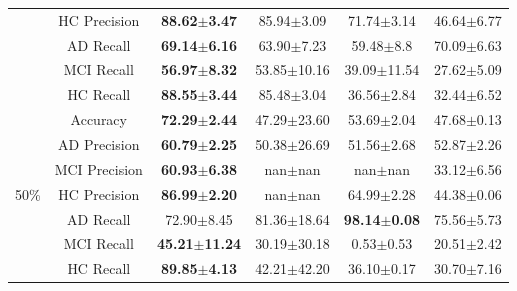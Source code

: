 \begin{table}[ht]
\begin{tabular}{c c cccc}
    & HC Precision & \multicolumn{1}{c}{{\bfseries 88.62$\pm$3.47}} & \multicolumn{1}{c}{85.94$\pm$3.09} & \multicolumn{1}{c}{71.74$\pm$3.14} & 46.64$\pm$6.77\\
    & AD Recall & \multicolumn{1}{c}{{\bfseries 69.14$\pm$6.16}} & \multicolumn{1}{c}{63.90$\pm$7.23} & \multicolumn{1}{c}{59.48$\pm$8.8} & 70.09$\pm$6.63\\
    & MCI Recall & \multicolumn{1}{c}{{\bfseries 56.97$\pm$8.32}} & \multicolumn{1}{c}{53.85$\pm$10.16} & \multicolumn{1}{c}{39.09$\pm$11.54} & 27.62$\pm$5.09\\
    & HC Recall & \multicolumn{1}{c}{{\bfseries 88.55$\pm$3.44}} & \multicolumn{1}{c}{85.48$\pm$3.04} & \multicolumn{1}{c}{36.56$\pm$2.84} & 32.44$\pm$6.52\\
    \midrule
    \multirow{7}{*}{50\%} %
    & Accuracy & \multicolumn{1}{c}{{\bfseries 72.29$\pm$2.44}} & \multicolumn{1}{c}{47.29$\pm$23.60} & \multicolumn{1}{c}{53.69$\pm$2.04} & 47.68$\pm$0.13\\
    & AD Precision & \multicolumn{1}{c}{{\bfseries 60.79$\pm$2.25}} & \multicolumn{1}{c}{50.38$\pm$26.69} & \multicolumn{1}{c}{51.56$\pm$2.68} & 52.87$\pm$2.26\\
    & MCI Precision & \multicolumn{1}{c}{{\bfseries 60.93$\pm$6.38}} & \multicolumn{1}{c}{nan$\pm$nan} & \multicolumn{1}{c}{nan$\pm$nan} & 33.12$\pm$6.56\\
    & HC Precision & \multicolumn{1}{c}{{\bfseries 86.99$\pm$2.20}} & \multicolumn{1}{c}{nan$\pm$nan} & \multicolumn{1}{c}{64.99$\pm$2.28} & 44.38$\pm$0.06\\
    & AD Recall & \multicolumn{1}{c}{72.90$\pm$8.45} & \multicolumn{1}{c}{81.36$\pm$18.64} & \multicolumn{1}{c}{{\bfseries 98.14$\pm$0.08}} & 75.56$\pm$5.73\\
    & MCI Recall & \multicolumn{1}{c}{{\bfseries 45.21$\pm$11.24}} & \multicolumn{1}{c}{30.19$\pm$30.18} & \multicolumn{1}{c}{0.53$\pm$0.53} & 20.51$\pm$2.42\\
    & HC Recall & \multicolumn{1}{c}{{\bfseries 89.85$\pm$4.13}} & \multicolumn{1}{c}{42.21$\pm$42.20} & \multicolumn{1}{c}{36.10$\pm$0.17} & 30.70$\pm$7.16\\
        \bottomrule
    \end{tabular}
\end{table}

